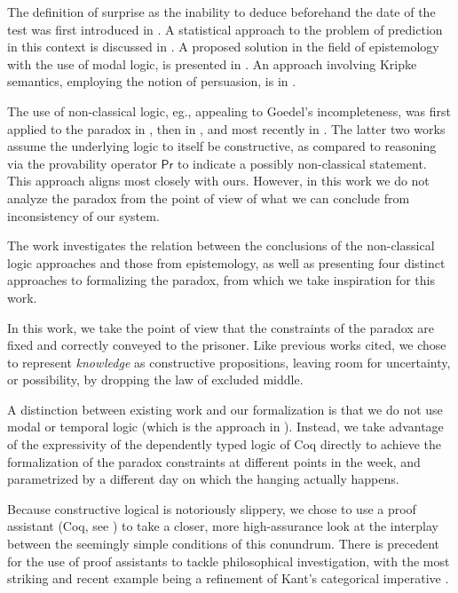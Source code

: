 \documentclass[runningheads]{llncs}
\begin{document}
The definition of surprise as the inability to deduce beforehand the date of the test
was first introduced in \cite{prediction}. A statistical approach to the problem
of prediction in this context is discussed in \cite{statistical}.
A proposed solution in the field of epistemology with the use of modal
logic, is presented in \cite{modalepistemic}. An approach involving
Kripke semantics, employing the notion of persuasion, is in \cite{kripkemodal}.

The use of non-classical logic,
eg., appealing to Goedel's incompleteness, was first applied to the
paradox in \cite{goedelized}, then in \cite{godelinconsistent}, and most recently
in \cite{constructive} \cite{nonpredet}. The latter two works assume the underlying logic to itself be
constructive, as compared to reasoning via the provability operator $\mathsf{Pr}$ to indicate
a possibly non-classical statement. This approach aligns most closely with ours.
However, in this work we do not analyze the paradox from the point of view of
what we can conclude from inconsistency of our system.

The work \cite{fourpossible} investigates the relation between the conclusions
of the non-classical logic approaches and those from epistemology, as well
as presenting four distinct approaches to formalizing the paradox, from which
we take inspiration for this work.

In this work, we take the point of view that the constraints of the paradox are
fixed and correctly conveyed to the prisoner.
Like previous works cited, we chose to represent
\emph{knowledge} as constructive propositions, leaving room for uncertainty, or possibility, by
dropping the law of excluded middle.

A distinction between existing work and our formalization is that
we do not use modal or temporal logic (which is the approach in \cite{modalepistemic}).
Instead, we take advantage of the expressivity of the dependently typed logic of Coq directly to
achieve the formalization of the paradox constraints at different points in the week,
and parametrized by a different day on which the hanging actually happens.

Because constructive logical is notoriously slippery, we chose to use a proof
assistant (Coq, see \cite{coqmanual}) to take a closer, more high-assurance look at the
interplay between the seemingly simple conditions of this conundrum.
There is precedent for the use of proof assistants to tackle philosophical
investigation, with the most striking and recent example
being a refinement of Kant's categorical imperative \cite{categoricalkant}.
\end{document}

